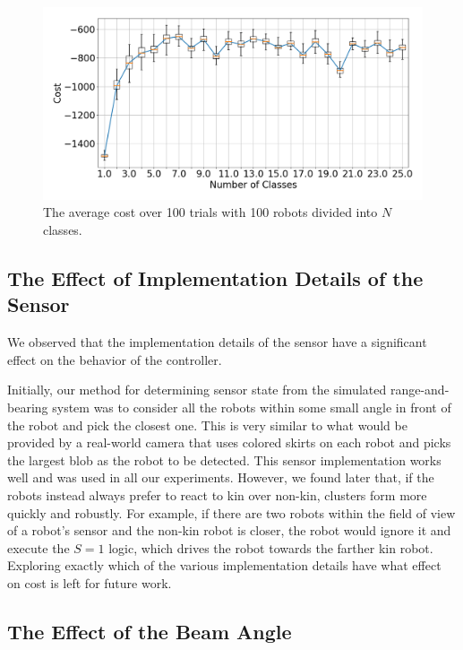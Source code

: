 \documentclass[letterpaper, 10 pt, conference]{ieeeconf}
\begin{document}
  \begin{figure}[t]
    \centering
    \includegraphics[width=1\linewidth]{./images/num_classes_vs_cost_100_robots.png}
    \caption{The average cost over 100 trials with 100 robots divided into $N$ classes.}
    \label{fig:num_classes_100}
  \end{figure}

  \subsection{The Effect of Implementation Details of the Sensor} \label{section:sensor_impl}

  We observed that the implementation details of the sensor have a significant
  effect on the behavior of the controller.

  Initially, our method for determining sensor state from the simulated
  range-and-bearing system was to consider all the robots within some small angle
  in front of the robot and pick the closest one. This is very similar to what
  would be provided by a real-world camera that uses colored skirts on each robot
  and picks the largest blob as the robot to be detected. This sensor
  implementation works well and was used in all our experiments. However,
  we found later that, if the robots instead always prefer to react to kin over
  non-kin, clusters form more quickly and robustly. For example, if there are
  two robots within the field of view of a robot's sensor and the non-kin robot is
  closer, the robot would ignore it and execute the $S=1$ logic, which drives the
  robot towards the farther kin robot. Exploring exactly which of the various
  implementation details have what effect on cost is left for future work.

  \subsection{The Effect of the Beam Angle} \label{sec:aperture_angle}
\end{document}
